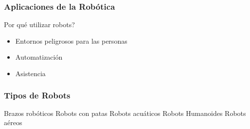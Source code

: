 \begin{frame}
    \frametitle{Aplicaciones de la Robótica}
    
    

    Por qué utilizar robots?
    \begin{itemize}
        \item Entornos peligrosos para las personas
        \item Automatización
        \item Asistencia
    \end{itemize}

\end{frame}

\begin{frame}
    \frametitle{Tipos de Robots}
    
    Brazos robóticos
    Robots con patas
    Robots acuáticos
    Robots Humanoides
    Robots aéreos
    
\end{frame}


